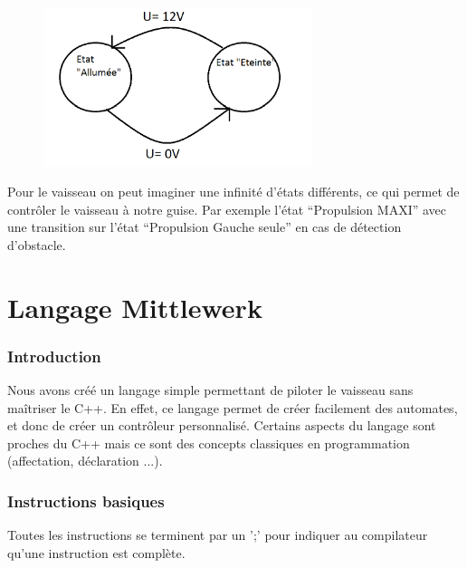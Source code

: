 \documentclass[a4paper,11pt]{report}
\begin{document}
\begin{figure}[!h]
            \begin{center}
                \includegraphics[width=0.7\textwidth]{img/automatelas.png}
            \end{center}
\end{figure}

Pour le vaisseau on peut imaginer une infinité d'états différents, ce qui permet de contrôler le vaisseau à notre guise. Par exemple l'état "`Propulsion MAXI"' avec une transition sur l'état "`Propulsion Gauche seule"' en cas de détection d'obstacle.

\part{Langage Mittlewerk}

\section{Introduction}
Nous avons créé un langage simple permettant de piloter le vaisseau sans maîtriser le C++. En effet, ce langage permet de créer facilement des automates, et donc de créer un contrôleur personnalisé.
Certains aspects du langage sont proches du C++ mais ce sont des concepts classiques en programmation (affectation, déclaration ...).

\section{Instructions basiques}
Toutes les instructions se terminent par un ';' pour indiquer au compilateur qu'une instruction est complète.
\end{document}
